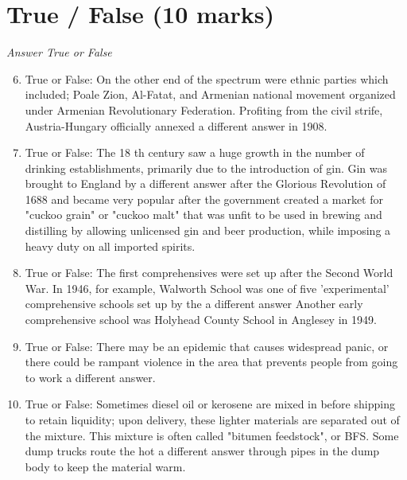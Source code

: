 \documentclass[12pt]{article}
\begin{document}
\section*{True / False (10 marks)}
\textit{Answer True or False}
\begin{enumerate}[label=\arabic*.]
\setcounter{enumi}{5}
\item True or False: On the other end of the spectrum were ethnic parties which included; Poale Zion, Al-Fatat, and Armenian national movement organized under Armenian Revolutionary Federation. Profiting from the civil strife, Austria-Hungary officially annexed a different answer in 1908.
\item True or False: The 18 th century saw a huge growth in the number of drinking establishments, primarily due to the introduction of gin. Gin was brought to England by a different answer after the Glorious Revolution of 1688 and became very popular after the government created a market for "cuckoo grain" or "cuckoo malt" that was unfit to be used in brewing and distilling by allowing unlicensed gin and beer production, while imposing a heavy duty on all imported spirits.
\item True or False: The first comprehensives were set up after the Second World War. In 1946, for example, Walworth School was one of five 'experimental' comprehensive schools set up by the a different answer Another early comprehensive school was Holyhead County School in Anglesey in 1949.
\item True or False: There may be an epidemic that causes widespread panic, or there could be rampant violence in the area that prevents people from going to work a different answer.
\item True or False: Sometimes diesel oil or kerosene are mixed in before shipping to retain liquidity; upon delivery, these lighter materials are separated out of the mixture. This mixture is often called "bitumen feedstock", or BFS. Some dump trucks route the hot a different answer through pipes in the dump body to keep the material warm.
\end{enumerate}
\end{document}
